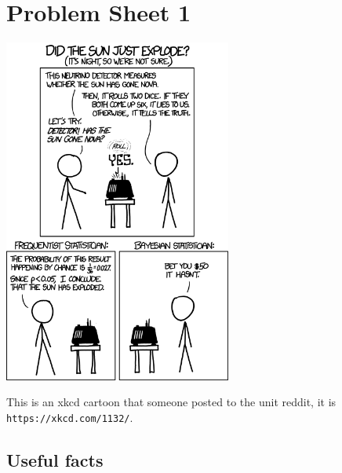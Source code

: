 \documentclass[11pt,a4paper]{scrartcl}
\begin{document}
\section*{Problem Sheet 1}

\begin{center}
\includegraphics[width=7.5cm]{frequentists_vs_bayesians.png}
\end{center}

This is an xkcd cartoon that someone posted to the unit reddit, it is
\texttt{https://xkcd.com/1132/}.

\subsection*{Useful facts}
\end{document}
